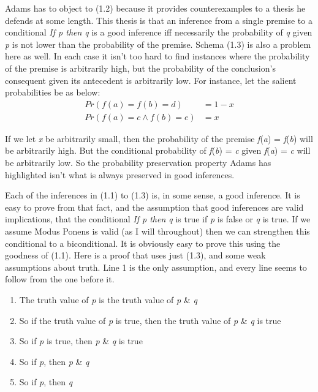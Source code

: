 Adams has to object to (1.2) because it provides counterexamples to a thesis he defends at some length. This thesis is that an inference from a single premise to a conditional \textit{If p then q} is a good inference iff necessarily the probability of \textit{q} given \textit{p} is not lower than the probability of the premise. Schema (1.3) is also a problem here as well. In each case it isn't too hard to find instances where the probability of the premise is arbitrarily high, but the probability of the conclusion's consequent given its antecedent is arbitrarily low. For instance, let the salient probabilities be as below:
\begin{align}
Pr(f(a) = f(b) = d) &= 1-x \\
Pr(f(a) = c \wedge f(b) = e) &= x
\end{align}

\noindent If we let \textit{x} be arbitrarily small, then the probability of the premise \textit{f}(\textit{a}) = \textit{f}(\textit{b}) will be arbitrarily high. But the conditional probability of \textit{f}(\textit{b}) = \textit{c} given \textit{f}(\textit{a}) = \textit{c} will be arbitrarily low. So the probability preservation property Adams has highlighted isn't what is always preserved in good inferences.

Each of the inferences in (1.1) to (1.3) is, in some sense, a good inference. It is easy to prove from that fact, and the assumption that good inferences are valid implications, that the conditional \textit{If p then q} is true if \textit{p} is false or \textit{q} is true. If we assume Modus Ponens is valid (as I will throughout) then we can strengthen this conditional to a biconditional. It is obviously easy to prove this using the goodness of (1.1). Here is a proof that uses just (1.3), and some weak assumptions about truth. Line 1 is the only assumption, and every line seems to follow from the one before it.

\renewcommand{\labelenumi}{(\arabic{enumi})}
\begin{enumerate}
\setcounter{enumi}{0}
\item The truth value of \textit{p} is the truth value of \textit{p} \& \textit{q}

\item So if the truth value of \textit{p} is true, then the truth value of \textit{p} \& \textit{q} is true

\item So if \textit{p} is true, then \textit{p} \& \textit{q} is true

\item So if \textit{p}, then \textit{p} \& \textit{q}

\item So if \textit{p}, then \textit{q}
\end{enumerate}

